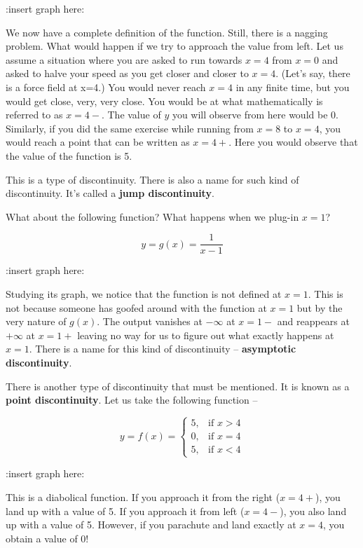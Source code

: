 :insert graph here:

We now have a complete definition of the function. Still, there is a nagging problem. What would happen if we try to approach the value from left. Let us assume a situation where you are asked to run towards $x=4$ from $x=0$ and asked to halve your speed as you get closer and closer to $x=4$. (Let's say, there is a force field at x=4.) You would never reach $x=4$ in any finite time, but you would get close, very, very close. You would be at what mathematically is referred to as $x=4-$. The value of $y$ you will observe from here would be 0. Similarly, if you did the same exercise while running from $x=8$ to $x=4$, you would reach a point that can be written as $x=4+$. Here you would observe that the value of the function is 5.

This is a type of discontinuity. There is also a name for such kind of discontinuity. It's called a \textbf{jump discontinuity}.

What about the following function? What happens when we plug-in $x=1$?

\begin{equation}
    y = g(x) = \frac{1}{x-1}
\end{equation}

:insert graph here:

Studying its graph, we notice that the function is not defined at $x = 1$. This is not because someone has goofed around with the function at $x=1$ but by the very nature of $g(x)$. The output vanishes at $-\infty$ at $x=1-$ and reappears at $+\infty$ at $x=1+$ leaving no way for us to figure out what exactly happens at $x=1$. There is a name for this kind of discontinuity -- \textbf{asymptotic discontinuity}.

There is another type of discontinuity that must be mentioned. It is known as a \textbf{point discontinuity}. Let us take the following function --

\begin{equation}
    y = f(x)=
\begin{cases}
    5 ,& \text{if } x > 4\\
    0, & \text{if } x = 4\\
    5, & \text{if } x < 4
\end{cases}
\label{eq:complete}
\end{equation}

:insert graph here:

This is a diabolical function. If you approach it from the right ($x=4+$), you land up with a value of 5. If you approach it from left ($x=4-$), you also land up with a value of 5. However, if you parachute and land exactly at $x=4$, you obtain a value of 0!

